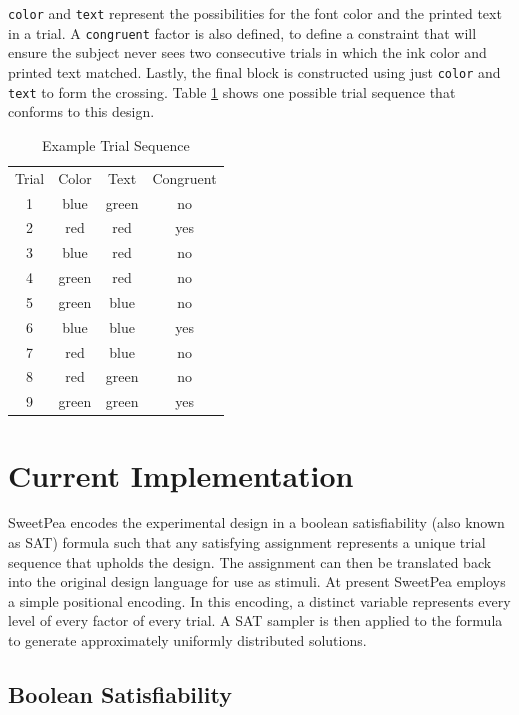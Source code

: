 \texttt{color} and \texttt{text} represent the possibilities for the font color and the printed text in a trial. A \texttt{congruent} factor is also defined, to define a constraint that will ensure the subject never sees two consecutive trials in which the ink color and printed text matched. Lastly, the final block is constructed using just \texttt{color} and \texttt{text} to form the crossing. Table \ref{tab:example_sequence} shows one possible trial sequence that conforms to this design.

\begin{table}[htb]
  \centering
  \caption{Example Trial Sequence}
\begin{tabular}{cccc}
Trial & Color & Text  & Congruent \\
1     & blue  & green & no        \\
2     & red   & red   & yes       \\
3     & blue  & red   & no        \\
4     & green & red   & no        \\
5     & green & blue  & no        \\
6     & blue  & blue  & yes       \\
7     & red   & blue  & no        \\
8     & red   & green & no        \\
9     & green & green & yes
\end{tabular}
\label{tab:example_sequence}
\end{table}


\section{Current Implementation}

SweetPea encodes the experimental design in a boolean satisfiability (also known as SAT) formula such that any satisfying assignment represents a unique trial sequence that upholds the design. The assignment can then be translated back into the original design language for use as stimuli. At present SweetPea employs a simple positional encoding. In this encoding, a distinct variable represents every level of every factor of every trial. A SAT sampler is then applied to the formula to generate approximately uniformly distributed solutions.

\subsection{Boolean Satisfiability}

